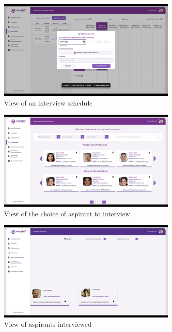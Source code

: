 \documentclass{scrreprt}
\begin{document}
\begin{figure}[H]
	\centering \small
	\includegraphics[width=0.8\textwidth]{WebPrototype/wflow-31-2.jpg}
	\caption{View of an interview schedule}
\end{figure}

\begin{figure}[H]
	\centering \small
	\includegraphics[width=0.8\textwidth]{WebPrototype/wflow-31.jpeg}
	\caption{View of the choice of aspirant to interview}
\end{figure}

\begin{figure}[H]
	\centering \small
	\includegraphics[width=0.8\textwidth]{WebPrototype/wflow-32.jpeg}
	\caption{View of aspirants interviewed}
\end{figure}
\end{document}
